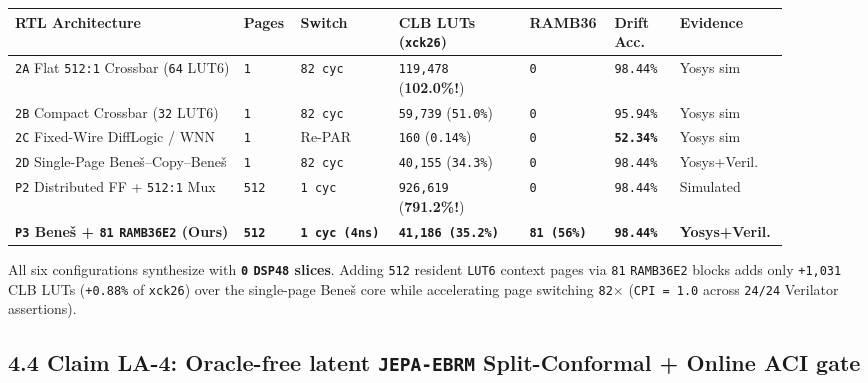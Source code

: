 \documentclass[10pt]{article}
\begin{document}
{\footnotesize\setlength{\tabcolsep}{3.5pt}
\begin{longtable}{@{}L{0.29\linewidth}C{0.06\linewidth}C{0.12\linewidth}C{0.16\linewidth}C{0.09\linewidth}C{0.08\linewidth}L{0.10\linewidth}@{}}
\toprule
\textbf{RTL Architecture} & \textbf{Pages} & \textbf{Switch} & \textbf{CLB LUTs (\texttt{xck26})} & \textbf{RAMB36} & \textbf{Drift Acc.} & \textbf{Evidence} \\
\midrule
\endhead
\texttt{2A} Flat \texttt{512:1} Crossbar (\texttt{64} LUT6) & \texttt{1} & \texttt{82 cyc} & \texttt{119,478} (\textbf{102.0\%!}) & \texttt{0} & \texttt{98.44\%} & Yosys sim \\
\texttt{2B} Compact Crossbar (\texttt{32} LUT6) & \texttt{1} & \texttt{82 cyc} & \texttt{59,739} (\texttt{51.0\%}) & \texttt{0} & \texttt{95.94\%} & Yosys sim \\
\texttt{2C} Fixed-Wire DiffLogic / WNN & \texttt{1} & Re-PAR & \texttt{160} (\texttt{0.14\%}) & \texttt{0} & \textbf{\texttt{52.34\%}} & Yosys sim \\
\texttt{2D} Single-Page Bene\v{s}--Copy--Bene\v{s} & \texttt{1} & \texttt{82 cyc} & \texttt{40,155} (\texttt{34.3\%}) & \texttt{0} & \texttt{98.44\%} & Yosys+Veril. \\
\texttt{P2} Distributed FF + \texttt{512:1} Mux & \texttt{512} & \texttt{1 cyc} & \texttt{926,619} (\textbf{791.2\%!}) & \texttt{0} & \texttt{98.44\%} & Simulated \\
\textbf{\texttt{P3} Bene\v{s} + \texttt{81} \texttt{RAMB36E2} (Ours)} & \textbf{\texttt{512}} & \textbf{\texttt{1 cyc (4ns)}} & \textbf{\texttt{41,186 (35.2\%)}} & \textbf{\texttt{81 (56\%)}} & \textbf{\texttt{98.44\%}} & \textbf{Yosys+Veril.} \\
\bottomrule
\end{longtable}
}

All six configurations synthesize with \textbf{\texttt{0} \texttt{DSP48} slices}. Adding \texttt{512} resident \texttt{LUT6} context pages via \texttt{81} \texttt{RAMB36E2} blocks adds only \texttt{+1,031} CLB LUTs (\texttt{+0.88\%} of \texttt{xck26}) over the single-page Bene\v{s} core while accelerating page switching \texttt{82$\times$} (\texttt{CPI = 1.0} across \texttt{24/24} Verilator assertions).

\subsection{4.4 Claim LA-4: Oracle-free latent \texttt{JEPA-EBRM} Split-Conformal + Online ACI gate}\label{claim-la4}
\end{document}
